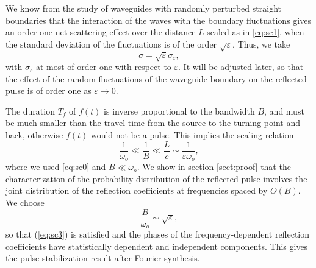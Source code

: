 \documentclass[final]{siamltex}
\begin{document}
We know from the study \cite{alonso2011wave} of waveguides with
randomly perturbed straight boundaries that the interaction of the
waves with the boundary fluctuations gives an order one net scattering
effect over the distance $L$ scaled as in \eqref{eq:sc1}, when the
standard deviation of the fluctuations is of the order
$\sqrt{\varepsilon}$. Thus, we take
\begin{equation}
\sigma = \sqrt{\varepsilon} \sigma_{\varepsilon},
\label{eq:sc2}
\end{equation}
with $\sigma_{\varepsilon}$ at most of order one with respect to ${\varepsilon}$. It will be adjusted later, so that
the effect of the random fluctuations of the waveguide boundary on the reflected pulse
is of order one as ${\varepsilon} \to 0$. 

The duration $T_f$ of $f(t)$ is inverse
proportional to the bandwidth $B$, and must be much smaller than the
travel time from the source to the turning point and back, otherwise
$f(t)$ would not be a pulse. This implies the scaling relation 
\begin{equation}
\label{eq:sc3}
\frac{1}{{\omega}_o} \ll \frac{1}{B} \ll \frac{L}{c} \sim  
\frac{1}{{\varepsilon}  {\omega}_o} ,
\end{equation}
where we used \eqref{eq:sc0} and $B \ll {\omega}_o$. We show in section
\ref{sect:proof} that the characterization of the probability
distribution of the reflected pulse involves the joint distribution of
the reflection coefficients at  frequencies spaced by  $O(B)$.  We choose 
\begin{equation}
\frac{B}{{\omega}_o} \sim \sqrt{\varepsilon} ,
\label{eq:sc4}
\end{equation}
so that (\ref{eq:sc3}) is satisfied and the phases of the frequency-dependent reflection coefficients
have statistically dependent and independent components. 
This gives the pulse stabilization result after Fourier synthesis.
\end{document}
